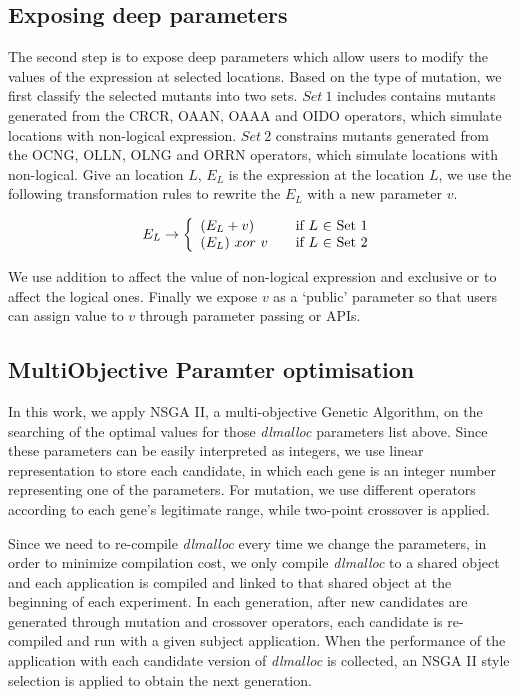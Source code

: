 \subsection{Exposing deep parameters}
The second step is to expose deep parameters which allow users to modify the values of the expression at selected locations. Based on the type of mutation, we first classify the selected mutants into two sets. $Set\ 1$ includes contains mutants generated from the CRCR, OAAN, OAAA and OIDO operators, which simulate locations with non-logical expression. $Set\ 2$ constrains mutants generated from the OCNG, OLLN, OLNG and ORRN operators, which simulate locations with non-logical. 
Give an location $L$, $E_L$ is the expression at the location $L$, we use the following transformation rules to rewrite the $E_L$ with a new parameter $v$.

\begin{equation}
 E_L \rightarrow \left\{
  \begin{array}{l l}
    (E_L + v) & \quad \text{if $L$ $\in$ Set 1}\\
    (E_L) \ xor \ v & \quad \text{if $L$ $\in$ Set 2}
    \end{array} \right.
\end{equation}

We use addition to affect the value of non-logical expression and exclusive or to affect the logical ones.
Finally we expose $v$ as a `public' parameter so that users can assign value to $v$ through parameter passing or APIs.

\subsection{MultiObjective Paramter optimisation}
\label{sec_nsgaii}
In this work, we apply NSGA II\cite{996017}, a multi-objective Genetic Algorithm, on the searching of the optimal values for those \emph{dlmalloc} parameters list above.
Since these parameters can be easily interpreted as integers, we use linear representation to store each candidate, in which each gene is an integer number representing one of the parameters. For mutation, we use different operators according to each gene's legitimate range, while two-point crossover is applied.

Since we need to re-compile \emph{dlmalloc} every time we change the parameters, in order to minimize compilation cost, we only compile \emph{dlmalloc} to a shared object and each application is compiled and linked to that shared object at the beginning of each experiment. In each generation, after new candidates are generated through mutation and crossover operators, each candidate is re-compiled and run with a given subject application. When the performance of the application with each candidate version of \emph{dlmalloc} is collected, an NSGA II style selection is applied to obtain the next generation.

